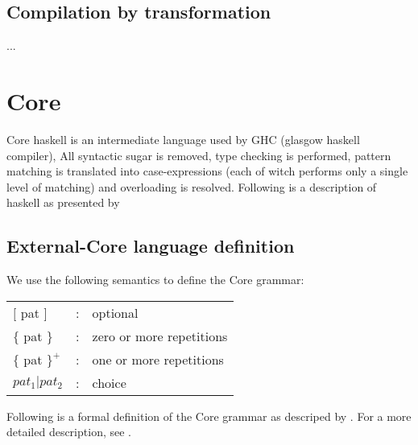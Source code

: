 \documentclass{article}
\begin{document}
\subsection{Compilation by transformation}

...

\section{Core}

Core haskell is an intermediate language used by GHC (glasgow haskell compiler),
All syntactic sugar is removed, type checking is performed, pattern matching is
translated into case-expressions (each of witch performs only a single level of
matching) and overloading is resolved.\cite{jones1992implementing} Following
is a description of haskell as presented by \cite{tolmach2010ghc}

\subsection{External-Core language definition}

We use the following semantics to define the Core grammar:

\begin{longtable}{ l c l }

$[$ pat $]$		& :	& optional			\\
$\{$ pat $\}$		& :	& zero or more repetitions	\\
$\{$ pat $\}^{+}$	& :	& one or more repetitions	\\
$pat_{1}|pat_{2}$	& :	& choice			\\

\end{longtable}

Following is a formal definition of the Core grammar as descriped by \cite{jones1992implementing}.
For a more detailed description, see \cite{jones1992implementing}.
\end{document}
